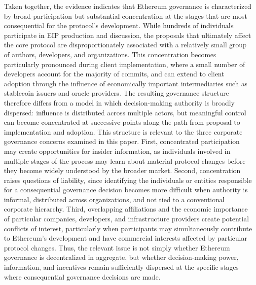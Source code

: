 \documentclass[No]{AEA}
\begin{document}
Taken together, the evidence indicates that Ethereum governance is characterized by broad participation but substantial concentration at the stages that are most consequential for the protocol's development. While hundreds of individuals participate in EIP production and discussion, the proposals that ultimately affect the core protocol are disproportionately associated with a relatively small group of authors, developers, and organizations. This concentration becomes particularly pronounced during client implementation, where a small number of developers account for the majority of commits, and can extend to client adoption through the influence of economically important intermediaries such as stablecoin issuers and oracle providers. The resulting governance structure therefore differs from a model in which decision-making authority is broadly dispersed: influence is distributed across multiple actors, but meaningful control can become concentrated at successive points along the path from proposal to implementation and adoption. This structure is relevant to the three corporate governance concerns examined in this paper. First, concentrated participation may create opportunities for insider information, as individuals involved in multiple stages of the process may learn about material protocol changes before they become widely understood by the broader market. Second, concentration raises questions of liability, since identifying the individuals or entities responsible for a consequential governance decision becomes more difficult when authority is informal, distributed across organizations, and not tied to a conventional corporate hierarchy. Third, overlapping affiliations and the economic importance of particular companies, developers, and infrastructure providers create potential conflicts of interest, particularly when participants may simultaneously contribute to Ethereum's development and have commercial interests affected by particular protocol changes. Thus, the relevant issue is not simply whether Ethereum governance is decentralized in aggregate, but whether decision-making power, information, and incentives remain sufficiently dispersed at the specific stages where consequential governance decisions are made.




\end{document}
